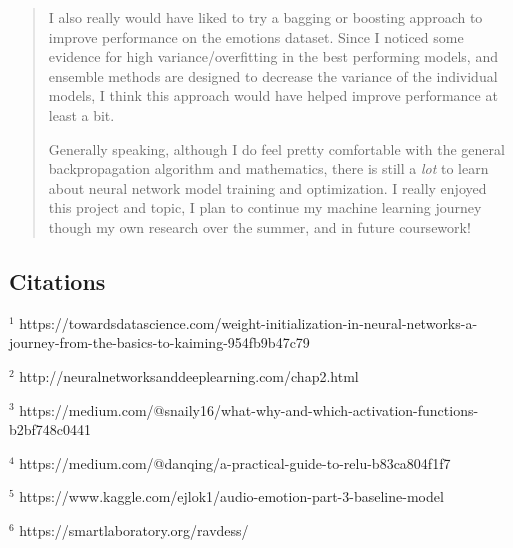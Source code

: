\documentclass{article}
\begin{document}
\begin{quote}
I also really would have liked to try a bagging or boosting approach to improve performance on the emotions dataset. Since I noticed some evidence for high variance/overfitting in the best performing models, and ensemble methods are designed to decrease the variance of the individual models, I think this approach would have helped improve performance at least a bit.

Generally speaking, although I do feel pretty comfortable with the general backpropagation algorithm and mathematics, there is still a \textit{lot} to learn about neural network model training and optimization. I really enjoyed this project and topic, I plan to continue my machine learning journey though my own research over the summer, and in future coursework!
\end{quote}

\subsection*{Citations}
$^1$ https://towardsdatascience.com/weight-initialization-in-neural-networks-a-journey-from-the-basics-to-kaiming-954fb9b47c79

$^2$ http://neuralnetworksanddeeplearning.com/chap2.html

$^3$ https://medium.com/@snaily16/what-why-and-which-activation-functions-b2bf748c0441

$^4$ https://medium.com/@danqing/a-practical-guide-to-relu-b83ca804f1f7

$^5$ https://www.kaggle.com/ejlok1/audio-emotion-part-3-baseline-model

$^6$ https://smartlaboratory.org/ravdess/
\end{document}
